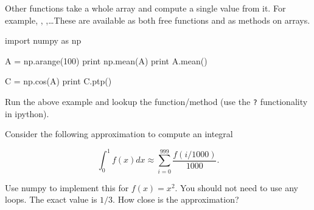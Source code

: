 Other functions take a whole array and compute a single value from it. For
example, , ,\ldots These are available as both free
functions and as methods on arrays.

\begin{python}
import numpy as np

A = np.arange(100)
print np.mean(A)
print A.mean()

C = np.cos(A)
print C.ptp()
\end{python}

\begin{exercise}
Run the above example and lookup the  function/method (use the \texttt{?} functionality in ipython).
\end{exercise}


\begin{exercise}
Consider the following approximation to compute an integral

\[
\int_0^{1} f(x)dx \approx \sum_{i = 0}^{999} \frac{f(i/1000)}{1000}.
\]

Use numpy to implement this for $f(x) = x^2$. You should not need to use any
loops. The exact value is $1/3$. How close is the approximation?
\end{exercise}



